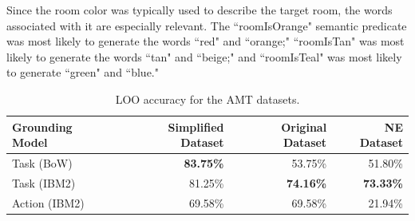 \documentclass[conference]{IEEEtran}
\begin{document}

Since the room color was typically used to describe the target room, the words associated with it are especially relevant. The ``roomIsOrange" semantic predicate was most likely to generate the words ``red" and ``orange;" ``roomIsTan" was most likely to generate the words ``tan" and ``beige;" and ``roomIsTeal" was most likely to generate ``green" and ``blue."



\begin{table}[tb]
\begin{center}
\begin{tabular}{@{}lrrr@{}} \toprule
Grounding Model & Simplified Dataset & Original Dataset & NE Dataset \\ \midrule
 Task (BoW) & {\bf 83.75\%} & 53.75\% & 51.80\%\\ 
 Task (IBM2) & 81.25\% & {\bf 74.16\%} & {\bf 73.33\%} \\ 
 Action (IBM2) & 69.58\% & 69.58\% & 21.94\% \\\bottomrule
\hline
 \end{tabular} 
 \caption{\small LOO accuracy for the AMT datasets.}
 \label{tab:res}
\end{center}
\end{table}


\end{document}
